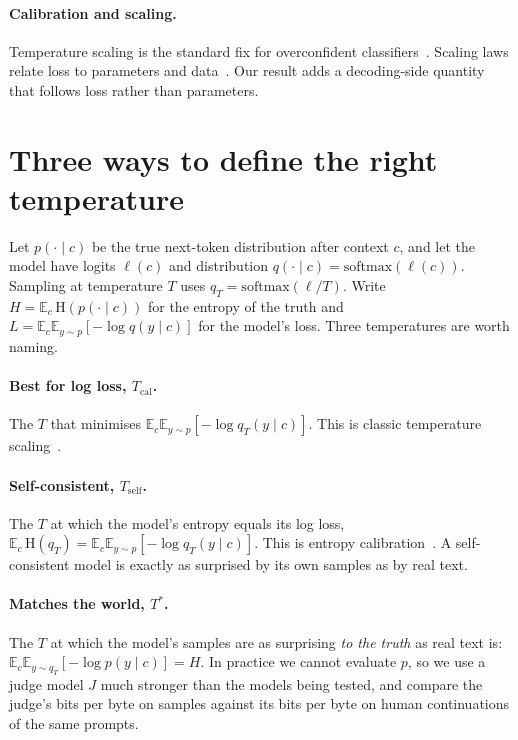 \documentclass[10pt]{article}
\newcommand{\E}{\mathbb{E}}
\newcommand{\Ts}{T^{*}}
\begin{document}
\paragraph{Calibration and scaling.} Temperature scaling is the standard fix for overconfident classifiers~\citep{guo2017calibration}. Scaling laws relate loss to parameters and data~\citep{kaplan2020scaling,hoffmann2022training}. Our result adds a decoding-side quantity that follows loss rather than parameters.

\section{Three ways to define the right temperature}
\label{sec:defs}

Let $p(\cdot \mid c)$ be the true next-token distribution after context $c$, and let the model have logits $\ell(c)$ and distribution $q(\cdot \mid c) = \mathrm{softmax}(\ell(c))$. Sampling at temperature $T$ uses $q_T = \mathrm{softmax}(\ell / T)$. Write $H = \E_c\, \mathrm{H}(p(\cdot \mid c))$ for the entropy of the truth and $L = \E_c \E_{y \sim p}[-\log q(y \mid c)]$ for the model's loss. Three temperatures are worth naming.

\paragraph{Best for log loss, $T_{\text{cal}}$.} The $T$ that minimises $\E_c \E_{y\sim p}[-\log q_T(y \mid c)]$. This is classic temperature scaling~\citep{guo2017calibration}.

\paragraph{Self-consistent, $T_{\text{self}}$.} The $T$ at which the model's entropy equals its log loss, $\E_c\, \mathrm{H}(q_T) = \E_c \E_{y\sim p}[-\log q_T(y \mid c)]$. This is entropy calibration~\citep{braverman2020calibration,cao2025entropy}. A self-consistent model is exactly as surprised by its own samples as by real text.

\paragraph{Matches the world, $\Ts$.} The $T$ at which the model's samples are as surprising \emph{to the truth} as real text is: $\E_c \E_{y \sim q_T}[-\log p(y \mid c)] = H$. In practice we cannot evaluate $p$, so we use a judge model $J$ much stronger than the models being tested, and compare the judge's bits per byte on samples against its bits per byte on human continuations of the same prompts.
\end{document}

